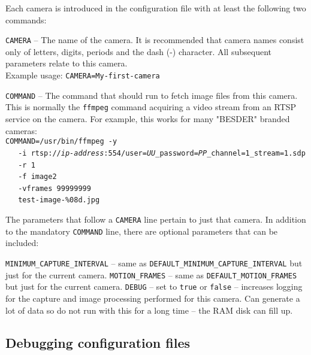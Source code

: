     Each camera is introduced in the configuration file with at least
    the following two commands:

    \BI
    \I \texttt{CAMERA} -- The name of the camera.  It is recommended that
       camera names consist only of letters, digits, periods and the dash
       (-) character. All subsequent parameters relate to this camera.\\
       Example usage: \texttt{CAMERA=My-first-camera}

    \I \texttt{COMMAND} -- The command that \PRODUCT{} should run to
       fetch image files from this camera.  This is normally the
       \texttt{ffmpeg} command acquiring a video stream from an RTSP
       service on the camera.  For example, this works for many
       "BESDER" branded cameras:\\
       \texttt{COMMAND=/usr/bin/ffmpeg -y}\BS{}\\
       \mbox{}~~\texttt{  -i rtsp://\emph{ip-address}:554/user=\emph{UU}\_password=\emph{PP}\_channel=1\_stream=1.sdp}\BS{}\\
       \mbox{}~~\texttt{  -r 1}\BS{}\\
       \mbox{}~~\texttt{  -f image2}\BS{}\\
       \mbox{}~~\texttt{  -vframes 99999999}\BS{}\\
       \mbox{}~~\texttt{  test-image-\%08d.jpg}

    \EI

    The parameters that follow a \texttt{CAMERA} line pertain to just
    that camera.  In addition to the mandatory \texttt{COMMAND} line,
    there are optional parameters that can be included:

    \BI
    \I \texttt{MINIMUM\_CAPTURE\_INTERVAL} -- same as
       \texttt{DEFAULT\_MINIMUM\_CAPTURE\_INTERVAL} but just for
       the current camera.
    \I \texttt{MOTION\_FRAMES} -- same as
       \texttt{DEFAULT\_MOTION\_FRAMES} but just for
       the current camera.
    \I \texttt{DEBUG} -- set to \texttt{true} or \texttt{false} --
       increases logging for the capture and image processing
       performed for this camera.  Can generate a lot of data so
       do not run with this for a long time -- the RAM disk can
       fill up.
    \EI

  \subsection{Debugging configuration files}

